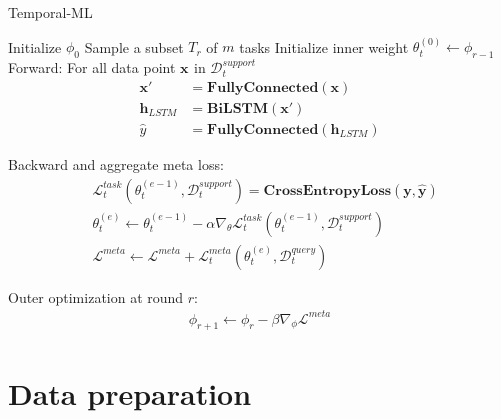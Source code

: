 \begin{algorithm}[H]
    \caption{Temporal-ML} \label{alg:maml}
    \begin{algorithmic}[1]
        \State Initialize $\phi_0$
         
            \State Sample a subset $T_r$ of $m$ tasks
             
                \State Initialize inner weight $\theta_t^{(0)} \leftarrow \phi_{r-1}$
                \State Forward: For all data point $\mathbf{x}_{}$ in $\mathcal{D}_t^{support}$
                \begin{align*}
                    \mathbf{x'} &= \mathbf{FullyConnected}\left( \mathbf{x} \right)\\
                    \mathbf{h}_{LSTM} &= \mathbf{BiLSTM}\left( \mathbf{x'} \right)\\
                    \hat{y} &= \mathbf{FullyConnected}\left( \mathbf{h}_{LSTM} \right)
                \end{align*}

                \State Backward and aggregate meta loss:
                \begin{align*}
                    &\mathcal{L}_t^{task}\left( \theta_t^{(e-1)}, \mathcal{D}_t^{support} \right) = \mathbf{CrossEntropyLoss}\left( \mathbf{y}, \hat{\mathbf{y}} \right)\\
                    &\theta_t^{(e)} \leftarrow \theta_t^{(e-1)} - \alpha\nabla_\theta\mathcal{L}_t^{task}\left( \theta_t^{(e-1)}, \mathcal{D}_t^{support} \right)\\
                    &\mathcal{L}^{meta} \leftarrow \mathcal{L}^{meta} + \mathcal{L}_t^{meta}\left( \theta_t^{(e)}, \mathcal{D}_t^{query} \right)
                \end{align*}
            \EndFor

            \State Outer optimization at round $r$:
            \begin{align*}
                \phi_{r+1} \leftarrow \phi_r - \beta\nabla_\phi\mathcal{L}^{meta}
            \end{align*}
        \EndFor
    \end{algorithmic}
\end{algorithm}

\section{Data preparation}
\label{sec:data_prep}

